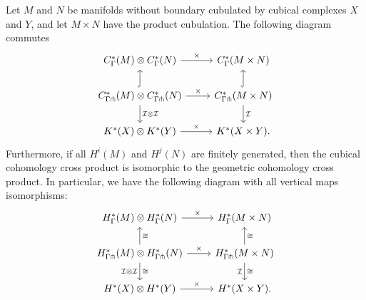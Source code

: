 \begin{proposition}\label{P: cross product comparison}
	Let $M$ and $N$ be manifolds without boundary cubulated by cubical complexes $X$ and $Y$, and let $M \times N$ have the product cubulation.
	The following diagram commutes
	\[
	\begin{tikzcd}
		C^*_{\Gamma}(M) \otimes C^*_{\Gamma}(N) \arrow{r}{\times} & C^*_{\Gamma}(M \times N) \\
		C^*_{\Gamma\pf}(M) \otimes C^*_{\Gamma\pf}(N) \arrow{r}{\times} \arrow[u, hook] \arrow[d, "\mc I \otimes \mc I"] & C^*_{\Gamma\pf}(M \times N) \arrow[u, hook] \arrow[d, "\mc I"] \\
		K^*(X) \otimes K^*(Y) \arrow{r}{\times} & K^*(X \times Y).
	\end{tikzcd}
	\]
	Furthermore, if all $H^i(M)$ and $H^j(N)$ are finitely generated, then the cubical cohomology cross product is isomorphic to the geometric cohomology cross product.
	In particular, we have the following diagram with all vertical maps isomorphisms:
	\[
	\begin{tikzcd}
		H^*_{\Gamma}(M) \otimes H^*_{\Gamma}(N) \arrow{r}{\times} & H^*_{\Gamma}(M \times N) \\
		H^*_{\Gamma\pf}(M) \otimes H^*_{\Gamma\pf}(N) \arrow{r}{\times} \arrow[u, "\cong"'] \arrow[d, "\cong", "\mc I \otimes \mc I"'] &
		H^*_{\Gamma\pf}(M \times N) \arrow[u, "\cong"'] \arrow[d, "\cong", "\mc I"'] \\
		H^*(X) \otimes H^*(Y) \arrow{r}{\times} & H^*(X \times Y).
	\end{tikzcd}
	\]
\end{proposition}

